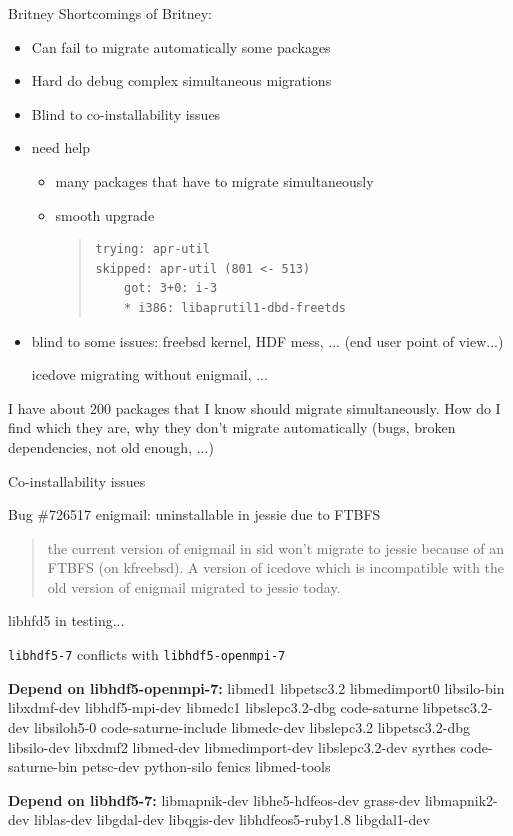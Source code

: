 \documentclass[xcolor={dvipsnames}]{beamer}
\begin{document}
\begin{frame}[fragile]{Britney}
Shortcomings of Britney:
\begin{itemize}
\item Can fail to migrate automatically some packages
\item Hard do debug complex simultaneous migrations
\item Blind to co-installability issues
\end{itemize}

\begin{itemize}
\item need help
\begin{itemize}
\item many packages that have to migrate simultaneously 
\item smooth upgrade
\begin{quote}
\begin{verbatim}
trying: apr-util
skipped: apr-util (801 <- 513)
    got: 3+0: i-3
    * i386: libaprutil1-dbd-freetds
\end{verbatim}
\end{quote}
\end{itemize}
\item
blind to some issues: freebsd kernel, HDF mess, ...
(end user point of view...)

icedove migrating without enigmail, ...
\end{itemize}

I have about 200 packages that I know should migrate simultaneously.
How do I find which they are, why they don't migrate automatically
(bugs, broken dependencies, not old enough, ...)
\end{frame}

\begin{frame}{Co-installability issues}

Bug \#726517 \hspace{1cm}  enigmail: uninstallable in jessie due to FTBFS
\begin{quote}
the current version of enigmail in sid won’t migrate to jessie
because of an FTBFS (on kfreebsd). A version of icedove which
is incompatible with the old version of enigmail migrated to
jessie today.
\end{quote}

\end{frame}

\begin{frame}{libhfd5 in testing...}

\texttt{libhdf5-7} conflicts with \texttt{libhdf5-openmpi-7}

\textbf{Depend on libhdf5-openmpi-7:} libmed1 libpetsc3.2
libmedimport0 libsilo-bin libxdmf-dev libhdf5-mpi-dev libmedc1
libslepc3.2-dbg code-saturne libpetsc3.2-dev libsiloh5-0
code-saturne-include libmedc-dev libslepc3.2 libpetsc3.2-dbg
libsilo-dev libxdmf2 libmed-dev libmedimport-dev libslepc3.2-dev
syrthes code-saturne-bin petsc-dev python-silo fenics libmed-tools

\textbf{Depend on libhdf5-7:} libmapnik-dev libhe5-hdfeos-dev
grass-dev libmapnik2-dev liblas-dev libgdal-dev libqgis-dev
libhdfeos5-ruby1.8 libgdal1-dev
\end{frame}
\end{document}
